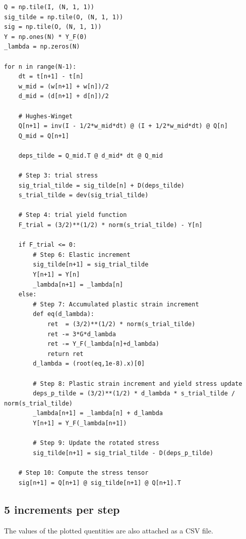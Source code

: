 \documentclass[12pt,a4paper]{article}
\begin{document}
\lstset{style=python}
\begin{lstlisting}
Q = np.tile(I, (N, 1, 1))
sig_tilde = np.tile(O, (N, 1, 1))
sig = np.tile(O, (N, 1, 1))
Y = np.ones(N) * Y_F(0)
_lambda = np.zeros(N)

for n in range(N-1):
    dt = t[n+1] - t[n]
    w_mid = (w[n+1] + w[n])/2
    d_mid = (d[n+1] + d[n])/2

    # Hughes-Winget
    Q[n+1] = inv(I - 1/2*w_mid*dt) @ (I + 1/2*w_mid*dt) @ Q[n]
    Q_mid = Q[n+1] 

    deps_tilde = Q_mid.T @ d_mid* dt @ Q_mid

    # Step 3: trial stress
    sig_trial_tilde = sig_tilde[n] + D(deps_tilde)
    s_trial_tilde = dev(sig_trial_tilde)

    # Step 4: trial yield function
    F_trial = (3/2)**(1/2) * norm(s_trial_tilde) - Y[n]

    if F_trial <= 0:
        # Step 6: Elastic increment
        sig_tilde[n+1] = sig_trial_tilde
        Y[n+1] = Y[n]
        _lambda[n+1] = _lambda[n]
    else:
        # Step 7: Accumulated plastic strain increment
        def eq(d_lambda):
            ret  = (3/2)**(1/2) * norm(s_trial_tilde)
            ret -= 3*G*d_lambda
            ret -= Y_F(_lambda[n]+d_lambda)
            return ret
        d_lambda = (root(eq,1e-8).x)[0]
        
        # Step 8: Plastic strain increment and yield stress update
        deps_p_tilde = (3/2)**(1/2) * d_lambda * s_trial_tilde / norm(s_trial_tilde)
        _lambda[n+1] = _lambda[n] + d_lambda
        Y[n+1] = Y_F(_lambda[n+1])
        
        # Step 9: Update the rotated stress
        sig_tilde[n+1] = sig_trial_tilde - D(deps_p_tilde)
    
    # Step 10: Compute the stress tensor
    sig[n+1] = Q[n+1] @ sig_tilde[n+1] @ Q[n+1].T
\end{lstlisting}

\newpage

\subsection*{5 increments per step}

The values of the plotted quentities are also attached as a CSV file.
\end{document}
